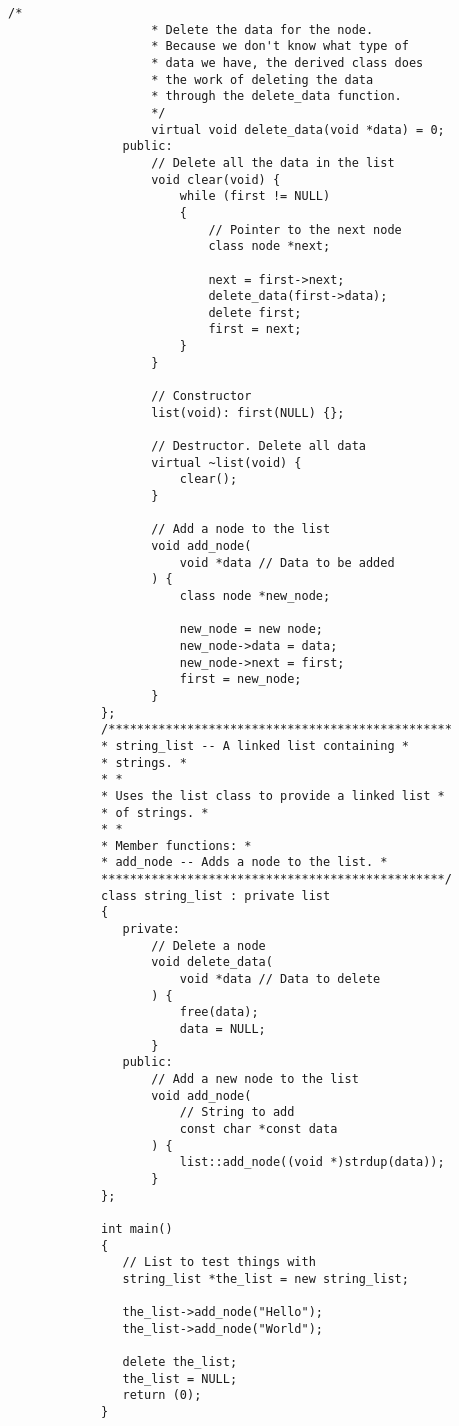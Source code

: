 \begin{LTR}
\begin{lstlisting}[style=C++Style]
             		/*
             		* Delete the data for the node.
             		* Because we don't know what type of
             		* data we have, the derived class does
             		* the work of deleting the data
             		* through the delete_data function.
             		*/
             		virtual void delete_data(void *data) = 0;
             	public:
             		// Delete all the data in the list
             		void clear(void) {
             			while (first != NULL)
             			{
             				// Pointer to the next node
             				class node *next;

             				next = first->next;
             				delete_data(first->data);
             				delete first;
             				first = next;
             			}
             		}

             		// Constructor
             		list(void): first(NULL) {};

             		// Destructor. Delete all data
             		virtual ~list(void) {
             			clear();
             		}

             		// Add a node to the list
             		void add_node(
             			void *data // Data to be added
             		) {
             			class node *new_node;

             			new_node = new node;
             			new_node->data = data;
             			new_node->next = first;
             			first = new_node;
             		}
             };
             /************************************************
             * string_list -- A linked list containing *
             * strings. *
             * *
             * Uses the list class to provide a linked list *
             * of strings. *
             * *
             * Member functions: *
             * add_node -- Adds a node to the list. *
             ************************************************/
             class string_list : private list
             {
             	private:
             		// Delete a node
             		void delete_data(
             			void *data // Data to delete
             		) {
             			free(data);
             			data = NULL;
             		}
             	public:
             		// Add a new node to the list
             		void add_node(
             			// String to add
             			const char *const data
             		) {
             			list::add_node((void *)strdup(data));
             		}
             };

             int main()
             {
             	// List to test things with
             	string_list *the_list = new string_list;

             	the_list->add_node("Hello");
             	the_list->add_node("World");

             	delete the_list;
             	the_list = NULL;
             	return (0);
             }
        \end{lstlisting}
\end{LTR}